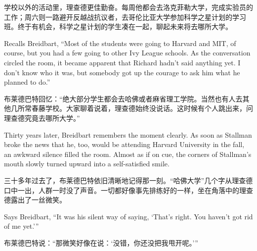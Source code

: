 \ifdefined\chs
学校以外的活动里，理查德更佳勤奋。每周他都会去洛克菲勒大学，完成实验员的工作；周六则一路避开反越战抗议者，去哥伦比亚大学参加科学之星计划的学习班。终于有机会，科学之星计划的学生凑在一起，聊起未来将去哪所大学。
\fi

\ifdefined\eng
Recalls Breidbart, ``Most of the students were going to Harvard and MIT, of course, but you had a few going to other Ivy League schools. As the conversation circled the room, it became apparent that Richard hadn't said anything yet. I don't know who it was, but somebody got up the courage to ask him what he planned to do.''
\fi

\ifdefined\chs
布莱德巴特回忆：“绝大部分学生都会去哈佛或者麻省理工学院。当然也有人去其他几所常春藤学校。大家聊着说着，理查德始终没说话。这时候有个人跳出来，问理查德究竟去哪所大学。”
\fi

\ifdefined\eng
Thirty years later, Breidbart remembers the moment clearly. As soon as Stallman broke the news that he, too, would be attending Harvard University in the fall, an awkward silence filled the room. Almost as if on cue, the corners of Stallman's mouth slowly turned upward into a self-satisfied smile.
\fi

\ifdefined\chs
三十多年过去了，布莱德巴特依旧清晰地记得那一刻。“哈佛大学”几个字从理查德口中一出，人群一时没了声音。一切都好像事先排练好的一样，坐在角落中的理查德露出了一丝微笑。
\fi

\ifdefined\eng
Says Breidbart, ``It was his silent way of saying, `That's right. You haven't got rid of me yet.'\hspace{0.01in}''
\fi

\ifdefined\chs
布莱德巴特说：“那微笑好像在说：‘没错，你还没把我甩开呢。’”
\fi

\ifdefined\eng
\theendnotes
\setcounter{endnote}{0}
